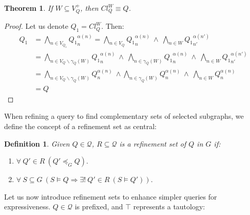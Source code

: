 \documentclass[mathematics,article,submit,pdftex,moreauthors]{Definitions/mdpi}
\newtheorem{definition}{Definition}[section]
\newtheorem{theorem}{Theorem}
\begin{document}
\begin{theorem}{}
    If $W\subseteq V^+_Q$, then $Cl_Q^W\equiv Q$.
\end{theorem}
\begin{proof}{}
	Let us denote $ Q_1 = Cl_Q^W $. Then:
	\begin{align*}
	Q_1 &= \bigwedge_{n\in V_{Q_1}} {Q_1}_n^{\alpha(n)}
	 =\bigwedge_{n\in V_Q} {Q_1}_n^{\alpha(n)}\ \wedge \ \bigwedge_{n\in W} {Q_1}_{n'}^{\alpha(n')}\\
	&= \bigwedge_{n\in V_Q\smallsetminus \gamma_Q(W)} {Q_1}_n^{\alpha(n)}\ \wedge \ \bigwedge_{n\in\gamma_Q(W)} {Q_1}_n^{\alpha(n)}\ \wedge \ \bigwedge_{n\in W} {Q_1}_{n'}^{\alpha(n')}\\
	&= \bigwedge_{n\in V_Q\smallsetminus \gamma_Q(W)} Q_n^{\alpha(n)}\ \wedge \bigwedge_{n\in\gamma_Q(W)} Q_n^{\alpha(n)}\ \wedge \ \bigwedge_{n\in W} Q_n^{\alpha(n)}\\
	&= Q
	\end{align*}
\end{proof}

When refining a query to find complementary sets of selected subgraphs, we define the concept of a refinement set as central:

\begin{definition}{}
    Given $Q\in \mathcal{Q}$, $R\subseteq \mathcal{Q}$ is a \emph{refinement set} of $Q$ in $G$ if:
    \begin{enumerate}
        \item $\forall\ Q'\in R\ (Q'\preceq_G Q).$
        \item $\forall\ S\subseteq G\ (S\vDash Q\Rightarrow \exists !\ Q'\in R\ (S\vDash Q')).$
    \end{enumerate}
\end{definition}\medskip

Let us now introduce refinement sets to enhance simpler queries for expressiveness. $Q\in\mathcal{Q}$ is prefixed, and $\top$ represents a tautology:
\end{document}
